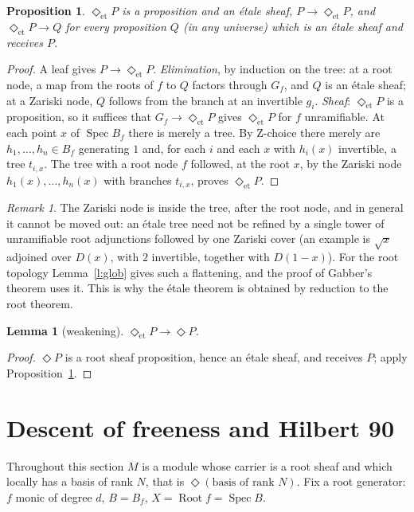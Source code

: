 \documentclass[11pt]{amsart}
\newtheorem{lemma}[theorem]{Lemma}
\newtheorem{proposition}[theorem]{Proposition}
\theoremstyle{definition}
\theoremstyle{remark}
\newtheorem{remark}[theorem]{Remark}
\newcommand{\Spec}{\operatorname{Spec}}
\newcommand{\Root}{\operatorname{Root}}
\newcommand{\close}{\Diamond}
\newcommand{\closeE}{\Diamond_{\mathrm{et}}}
\begin{document}
\begin{proposition}\label{p:closeE}
$\closeE P$ is a proposition and an \'etale sheaf, $P\to\closeE P$, and
$\closeE P\to Q$ for every proposition $Q$ (in any universe) which is an
\'etale sheaf and receives $P$.
\end{proposition}
\begin{proof}
A leaf gives $P\to\closeE P$. \emph{Elimination}, by induction on the tree:
at a root node, a map from the roots of $f$ to $Q$ factors through $G_f$,
and $Q$ is an \'etale sheaf; at a Zariski node, $Q$ follows from the branch
at an invertible $g_i$. \emph{Sheaf}: $\closeE P$ is a proposition, so it
suffices that $G_f\to\closeE P$ gives $\closeE P$ for $f$ unramifiable. At
each point $x$ of $\Spec B_f$ there is merely a tree. By Z-choice there
merely are $h_1,\dots,h_n\in B_f$ generating $1$ and, for each $i$ and each
$x$ with $h_i(x)$ invertible, a tree $t_{i,x}$. The tree with a root node
$f$ followed, at the root $x$, by the Zariski node $h_1(x),\dots,h_n(x)$
with branches $t_{i,x}$, proves $\closeE P$.
\end{proof}

\begin{remark}
The Zariski node is inside the tree, after the root node, and in general
it cannot be moved out: an \'etale tree need not be refined by a single
tower of unramifiable root adjunctions followed by one Zariski cover (an
example is $\sqrt x$ adjoined over $D(x)$, with $2$ invertible, together with
$D(1-x)$). For the root topology Lemma~\ref{l:glob} gives such a
flattening, and the proof of Gabber's theorem uses it. This is why the
\'etale theorem is obtained by reduction to the root theorem.
\end{remark}

\begin{lemma}[weakening]\label{l:weak}
$\closeE P\to\close P$.
\end{lemma}
\begin{proof}
$\close P$ is a root sheaf proposition, hence an \'etale sheaf, and receives
$P$; apply Proposition~\ref{p:closeE}.
\end{proof}

\section{Descent of freeness and Hilbert 90}

Throughout this section $M$ is a module whose carrier is a root sheaf and
which locally has a basis of rank $N$, that is $\close(\text{basis of
rank }N)$. Fix a root generator: $f$ monic of degree $d$, $B=B_f$,
$X=\Root f=\Spec B$.
\end{document}
